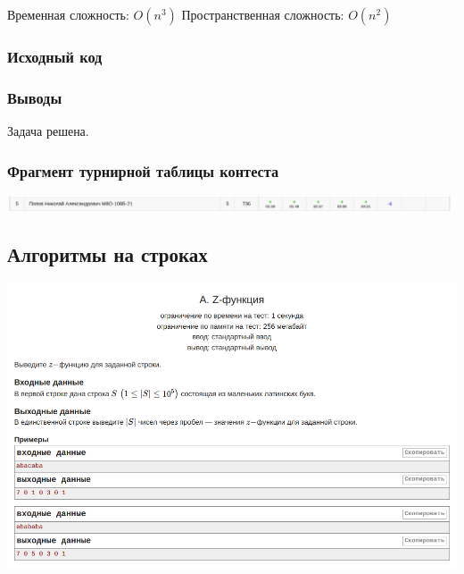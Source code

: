 Временная сложность: $O(n^3)$ \newline
Пространственная сложность: $O(n^2)$
\newline

\subsubsection*{Исходный код}


\subsubsection*{Выводы}
Задача решена.
\newline

\subsubsection*{Фрагмент турнирной таблицы контеста}
\begin{center}
\includegraphics[width=\textwidth]{standings/Contest8.png}\newline\noindent
\end{center}



\subsection*{Алгоритмы на строках}

\begin{center}
\includegraphics[width=\textwidth]{statements/Contest9A.png}
\end{center}

